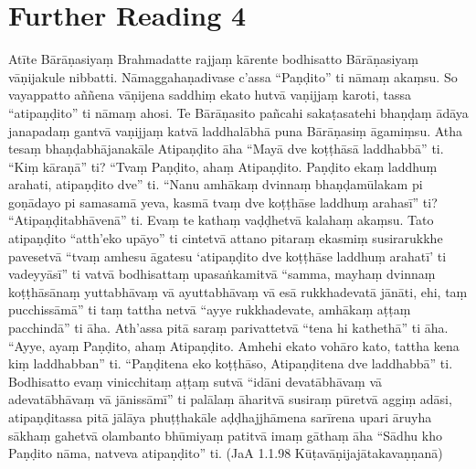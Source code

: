 \section*{Further Reading 4}

Atīte Bārāṇasiyaṃ Brahmadatte rajjaṃ kārente bodhisatto Bārāṇasiyaṃ vāṇijakule nibbatti. Nāmaggahaṇadivase c’assa “Paṇḍito” ti nāmaṃ akaṃsu. So vayappatto aññena vāṇijena saddhiṃ ekato hutvā vaṇijjaṃ karoti, tassa “atipaṇḍito” ti nāmaṃ ahosi. Te Bārāṇasito pañcahi sakaṭasatehi bhaṇḍaṃ ādāya janapadaṃ gantvā vaṇijjaṃ katvā laddhalābhā puna Bārāṇasiṃ āgamiṃsu. Atha tesaṃ bhaṇḍabhājanakāle Atipaṇḍito āha “Mayā dve koṭṭhāsā laddhabbā” ti. “Kiṃ kāraṇā” ti? “Tvaṃ Paṇḍito, ahaṃ Atipaṇḍito. Paṇḍito ekaṃ laddhuṃ arahati, atipaṇḍito dve” ti. “Nanu amhākaṃ dvinnaṃ bhaṇḍamūlakam pi goṇādayo pi samasamā yeva, kasmā tvaṃ dve koṭṭhāse laddhuṃ arahasī” ti? “Atipaṇḍitabhāvenā” ti. Evaṃ te kathaṃ vaḍḍhetvā kalahaṃ akaṃsu. Tato atipaṇḍito “atth’eko upāyo” ti cintetvā attano pitaraṃ ekasmiṃ susirarukkhe pavesetvā “tvaṃ amhesu āgatesu ‘atipaṇḍito dve koṭṭhāse laddhuṃ arahatī’ ti vadeyyāsī” ti vatvā bodhisattaṃ upasaṅkamitvā “samma, mayhaṃ dvinnaṃ koṭṭhāsānaṃ yuttabhāvaṃ vā ayuttabhāvaṃ vā esā rukkhadevatā jānāti, ehi, taṃ pucchissāmā” ti taṃ tattha netvā “ayye rukkhadevate, amhākaṃ aṭṭaṃ pacchindā” ti āha. Ath’assa pitā saraṃ parivattetvā “tena hi kathethā” ti āha. “Ayye, ayaṃ Paṇḍito, ahaṃ Atipaṇḍito. Amhehi ekato vohāro kato, tattha kena kiṃ laddhabban” ti. “Paṇḍitena eko koṭṭhāso, Atipaṇḍitena dve laddhabbā” ti. Bodhisatto evaṃ vinicchitaṃ aṭṭaṃ sutvā “idāni devatābhāvaṃ vā adevatābhāvaṃ vā jānissāmī” ti palālaṃ āharitvā susiraṃ pūretvā aggiṃ adāsi, atipaṇḍitassa pitā jālāya phuṭṭhakāle aḍḍhajjhāmena sarīrena upari āruyha sākhaṃ gahetvā olambanto bhūmiyaṃ patitvā imaṃ gāthaṃ āha “Sādhu kho Paṇḍito nāma, natveva atipaṇḍito” ti. (JaA 1.1.98 Kūṭavāṇijajātakavaṇṇanā)